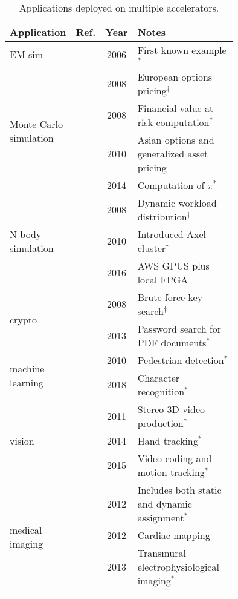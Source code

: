 \begin{table}[htp]
\centering
\caption{Applications deployed on multiple accelerators.}
\label{tbl:apps1}
\vspace{0.1in}
\begin{tabular}{p{0.15\linewidth} | c | c | p{0.6\linewidth}}
Application & Ref. & Year & Notes \\ \hline
EM sim & \cite{kdh+06} & 2006 & First known example$^*$ \\ \hline
\multirow{4}{\linewidth}{Monte Carlo simulation} & \cite{ytt+08} & 2008 & European options pricing$^\dag$  \\ \cline{2-4}
 & \cite{shsc08} & 2008 & Financial value-at-risk computation$^*$  \\ \cline{2-4}
 & \cite{tttl10} & 2010 & Asian options and generalized asset pricing \\ \cline{2-4}
 & \cite{admb14} & 2014 & Computation of $\pi$$^*$ \\ \hline
\multirow{3}{\linewidth}{N-body simulation} & \cite{ytt+08} & 2008 & Dynamic workload distribution$^\dag$ \\ \cline{2-4}
 & \cite{tl10} & 2010 & Introduced Axel cluster$^\dag$ \\ \cline{2-4}
 & \cite{sm16} & 2016 & AWS GPUS plus local FPGA \\ \hline
\multirow{2}{\linewidth}{crypto} & \cite{ytt+08} & 2008 & Brute force key search$^\dag$ \\ \cline{2-4}
 & \cite{dfg+13} & 2013 & Password search for PDF documents$^*$ \\ \hline
\multirow{2}{\linewidth}{machine learning} & \cite{bkdb10} & 2010 & Pedestrian detection$^*$ \\ \cline{2-4}
 & \cite{log+18} & 2018 & Character recognition$^*$ \\ \hline
\multirow{3}{*}{vision} & \cite{ghgb11} & 2011 & Stereo 3D video production$^*$ \\ \cline{2-4}
 & \cite{brf14} & 2014 & Hand tracking$^*$ \\ \cline{2-4}
 & \cite{rpm+15} & 2015 & Video coding and motion tracking$^*$ \\ \hline
\multirow{5}{\linewidth}{medical imaging} & \cite{szb+12} & 2012 & Includes both static and dynamic assignment$^*$ \\ \cline{2-4}
 & \cite{mjk12} & 2012 & Cardiac mapping \\ \cline{2-4}
 & \cite{sll13} & 2013 & Transmural electrophysiological imaging$^*$ \\ \cline{2-4}
$$
\end{tabular}
\end{table}
